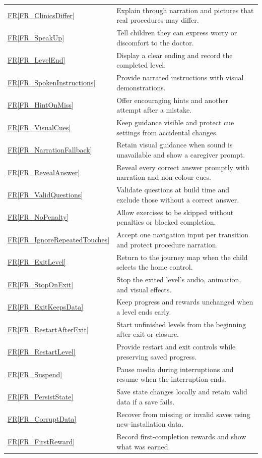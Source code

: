 \documentclass[10pt]{article}
\newcommand{\rref}[1]{\hyperref[#1]{FR\ref*{#1}}}
\begin{document}
\begin{longtable}{@{}>{\raggedright\arraybackslash}p{}
>{\raggedright\arraybackslash}p{}@{}}
\rref{FR_ClinicsDiffer} & Explain through narration and pictures that real procedures may differ. \\
\rref{FR_SpeakUp} & Tell children they can express worry or discomfort to the doctor. \\
\rref{FR_LevelEnd} & Display a clear ending and record the completed level. \\
\rref{FR_SpokenInstructions} & Provide narrated instructions with visual demonstrations. \\
\rref{FR_HintOnMiss} & Offer encouraging hints and another attempt after a mistake. \\
\rref{FR_VisualCues} & Keep guidance visible and protect cue settings from accidental changes. \\
\rref{FR_NarrationFallback} & Retain visual guidance when sound is unavailable and show a caregiver prompt. \\
\rref{FR_RevealAnswer} & Reveal every correct answer promptly with narration and non-colour cues. \\
\rref{FR_ValidQuestions} & Validate questions at build time and exclude those without a correct answer. \\
\rref{FR_NoPenalty} & Allow exercises to be skipped without penalties or blocked completion. \\
\rref{FR_IgnoreRepeatedTouches} & Accept one navigation input per transition and protect procedure narration. \\
\rref{FR_ExitLevel} & Return to the journey map when the child selects the home control. \\
\rref{FR_StopOnExit} & Stop the exited level's audio, animation, and visual effects. \\
\rref{FR_ExitKeepsData} & Keep progress and rewards unchanged when a level ends early. \\
\rref{FR_RestartAfterExit} & Start unfinished levels from the beginning after exit or closure. \\
\rref{FR_RestartLevel} & Provide restart and exit controls while preserving saved progress. \\
\rref{FR_Suspend} & Pause media during interruptions and resume when the interruption ends. \\
\rref{FR_PersistState} & Save state changes locally and retain valid data if a save fails. \\
\rref{FR_CorruptData} & Recover from missing or invalid saves using new-installation data. \\
\rref{FR_FirstReward} & Record first-completion rewards and show what was earned. \\

\end{longtable}
\end{document}
